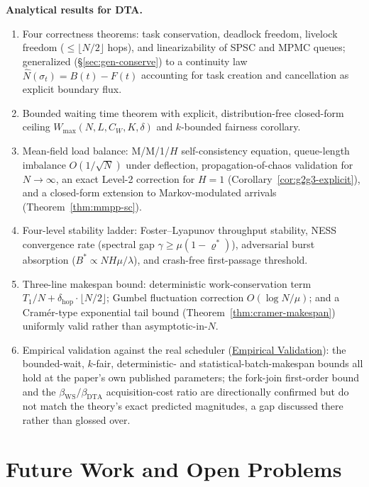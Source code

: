 \documentclass[11pt,a4paper]{report}
\newcommand{\Num}{\hat{N}}
\begin{document}
\medskip
\noindent\textbf{Analytical results for DTA.}
\begin{enumerate}
  \item Four correctness theorems: task conservation, deadlock freedom,
        livelock freedom ($\leq\lfloor N/2\rfloor$ hops), and
        linearizability of SPSC and MPMC queues; generalized
        (\S\ref{sec:gen-conserve}) to a continuity law
        $\Num(\sigma_t) = B(t) - F(t)$ accounting for task creation and
        cancellation as explicit boundary flux.
  \item Bounded waiting time theorem with explicit, distribution-free
        closed-form ceiling $W_{\max}(N,L,C_W,K,\delta)$ and $k$-bounded
        fairness corollary.
  \item Mean-field load balance: M/M/1/$H$ self-consistency equation,
        queue-length imbalance $O(1/\sqrt{N})$ under deflection,
        propagation-of-chaos validation for $N \to \infty$, an exact
        Level-2 correction for $H=1$ (Corollary~\ref{cor:g2g3-explicit}),
        and a closed-form extension to Markov-modulated arrivals
        (Theorem~\ref{thm:mmpp-sc}).
  \item Four-level stability ladder: Foster--Lyapunov throughput stability,
        NESS convergence rate (spectral gap $\gamma \geq \mu(1-\varrho^*)$),
        adversarial burst absorption ($B^* \propto NH\mu/\lambda$),
        and crash-free first-passage threshold.
  \item Three-line makespan bound: deterministic work-conservation term
        $T_1/N + \delta_{\mathrm{hop}}\cdot\lfloor N/2\rfloor$; Gumbel
        fluctuation correction $O(\log N/\mu)$; and a Cram\'er-type
        exponential tail bound (Theorem~\ref{thm:cramer-makespan})
        uniformly valid rather than asymptotic-in-$N$.
  \item Empirical validation against the real scheduler
        (\hyperref[chap:empirical_validation]{Empirical Validation}):
        the bounded-wait, $k$-fair, deterministic- and
        statistical-batch-makespan bounds all hold at the paper's own
        published parameters; the fork-join first-order bound and the
        $\beta_{\mathrm{WS}}/\beta_{\mathrm{DTA}}$ acquisition-cost ratio
        are directionally confirmed but do not match the theory's exact
        predicted magnitudes, a gap discussed there rather than glossed
        over.
\end{enumerate}

\section{Future Work and Open Problems}
\label{sec:future_work}
\end{document}

